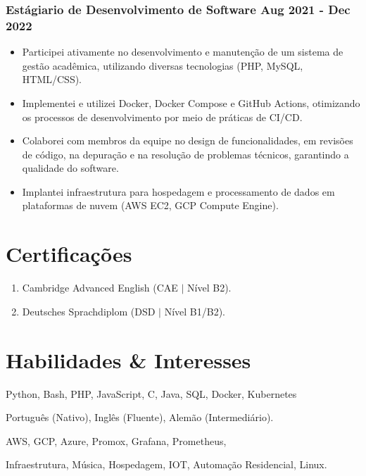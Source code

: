 \documentclass[11pt]{article} %
\begin{document}
\subsubsection{Estágiario de Desenvolvimento de Software \hfill  Aug 2021 - Dec 2022}
\begin{itemize}
    \item Participei ativamente no desenvolvimento e manutenção de um sistema de gestão acadêmica, utilizando diversas tecnologias (PHP, MySQL, HTML/CSS).
	\item Implementei e utilizei Docker, Docker Compose e GitHub Actions, otimizando os processos de desenvolvimento por meio de práticas de CI/CD.
	\item Colaborei com membros da equipe no design de funcionalidades, em revisões de código, na depuração e na resolução de problemas técnicos, garantindo a qualidade do software.
	\item Implantei infraestrutura para hospedagem e processamento de dados em plataformas de nuvem (AWS EC2, GCP Compute Engine).
\end{itemize}


\section{Certificações}
\begin{enumerate}[label=\null, left=0pt..0pt, itemsep=0pt]
    \item Cambridge Advanced English (CAE $|$ Nível B2).
	\item Deutsches Sprachdiplom (DSD $|$ Nível B1/B2).
\end{enumerate}

\section{Habilidades \& Interesses}
\begin{description}[itemsep=0pt]
	\item[Tecnologias] Python, Bash, PHP, JavaScript, C, Java, SQL, Docker, Kubernetes
	\item[Linguas] Português (Nativo), Inglês (Fluente), Alemão (Intermediário).
	\item[Hospedagem] AWS, GCP, Azure, Promox, Grafana, Prometheus, 
	\item[Interesses] Infraestrutura, Música, Hospedagem, IOT, Automação Residencial, Linux.
\end{description}
\end{document}
